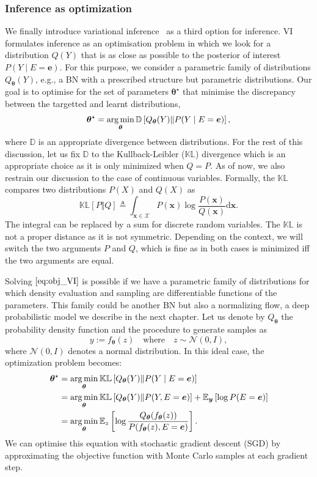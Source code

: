 \subsubsection{Inference as optimization}
We finally introduce variational inference~\citep[][VI]{blei2017variational} as a third option for inference. VI formulates inference as an optimisation problem in which we look for a distribution $Q(Y)$ that is as close as possible to the posterior of interest $P(Y\mid E=\bm{e})$. For this purpose, we consider a parametric family of distributions $Q_{\bm{\theta}}(Y)$, e.g., a BN with a prescribed structure but parametric distributions. Our goal is to optimise for the set of parameters  $\bm{\theta}^\star$ that minimise the discrepancy between the targetted and learnt distributions,
\begin{align}
  \bm{\theta}^\star = \operatorname*{arg\,min}_{\bm{\theta}} \mathbb{D}\left[Q_{\bm{\theta}}(Y)\Vert P(Y\mid E=\bm{e}) \right], \label{eq:obj_VI}
\end{align}
where $\mathbb{D}$ is an appropriate divergence between distributions. For the rest of this discussion, let us fix $\mathbb{D}$ to the Kullback-Leibler ($\mathbb{KL}$) divergence which is an appropriate choice as it is only minimized when $Q = P$. As of now, we also restrain our discussion to the case of continuous variables. Formally, the $\mathbb{KL}$ compares two distributions $P(X)$ and $Q(X)$ as $$\mathbb{KL}\left[P\Vert Q\right] \triangleq \int_{\bm{x} \in \mathcal{X}} P(\bm{x}) \log \frac{P(\bm{x})}{Q(\bm{x})} \text{d}\bm{x}.$$ The integral can be replaced by a sum for discrete random variables. The $\mathbb{KL}$ is not a proper distance as it is not symmetric. Depending on the context, we will switch the two arguments $P$ and $Q$, which is fine as in both cases  is minimized iff the two arguments are equal.

Solving $\Cref{eq:obj_VI}$ is possible if we have a parametric family of distributions for which density evaluation and sampling are differentiable functions of the parameters. This family could be another BN but also a normalizing flow, a deep probabilistic model we describe in the next chapter. Let us denote by $Q_{\bm{\theta}}$ the probability density function and the procedure to generate samples as $$ y := f_{\bm{\theta}}(z) \quad\text{where}\quad z\sim \mathcal{N}(0, I),$$
where $\mathcal{N}(0, I)$ denotes a normal distribution.
In this ideal case, the optimization problem becomes:
\begin{align}
  \bm{\theta}^\star &= \operatorname*{arg\,min}_{\bm{\theta}} \mathbb{KL}\left[Q_{\bm{\theta}}(Y)\Vert P(Y\mid E=\bm{e}) \right]\\ \label{eq:VI_optim}
  &= \operatorname*{arg\,min}_{\bm{\theta}} \mathbb{KL}\left[Q_{\bm{\theta}}(Y)\Vert P(Y, E=\bm{e}) \right] + \mathbb{E}_{\bm y}\left[\log P(E=\bm{e})\right]\\
  &= \operatorname*{arg\,min}_{\bm{\theta}} \mathbb{E}_{z}\left[ \log \frac{Q_{\bm{\theta}}(f_{\bm{\theta}}(z))}{P(f_{\bm{\theta}}(z), E=\bm{e})} \right].
\end{align}
We can optimise this equation with stochastic gradient descent (SGD) by approximating the objective function with Monte Carlo samples at each gradient step.

